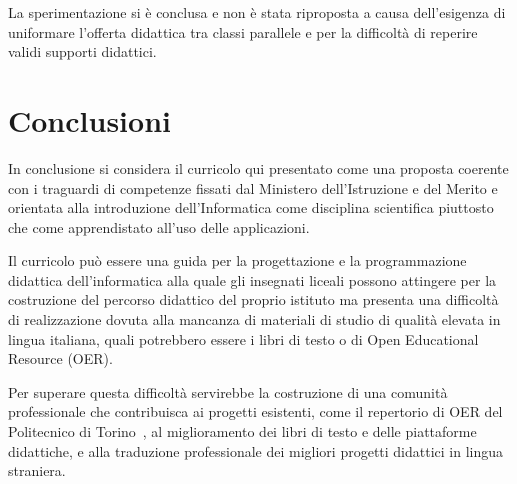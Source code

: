 \documentclass[a4paper]{easychair}
\begin{document}
La sperimentazione si è conclusa e non è stata riproposta a causa dell'esigenza di uniformare
l'offerta didattica tra classi parallele e per la difficoltà di reperire validi supporti
didattici.

\section{Conclusioni}
\label{sec:conclusioni}

In conclusione si considera il curricolo qui presentato come
una proposta coerente con i traguardi di competenze fissati dal  
Ministero dell'Istruzione e del Merito e orientata alla introduzione
dell'Informatica come disciplina scientifica piuttosto che come
apprendistato all'uso delle applicazioni.

Il curricolo può essere una guida per la progettazione e la programmazione
didattica dell'informatica %
alla quale gli insegnati liceali possono attingere per la costruzione del percorso
didattico del proprio istituto ma
presenta una difficoltà di realizzazione dovuta alla mancanza di materiali di studio di qualità elevata in lingua italiana,
quali potrebbero essere i libri di testo o di Open Educational Resource (OER).


Per superare questa difficoltà servirebbe la costruzione di una comunità professionale
che contribuisca ai progetti esistenti, come il repertorio di OER del Politecnico di Torino~\cite{fare},
al miglioramento dei libri di testo e delle piattaforme didattiche, e alla 
traduzione professionale dei migliori progetti didattici in lingua straniera.

\label{sect:bib}
%
%
%
\printbibliography
\end{document}
